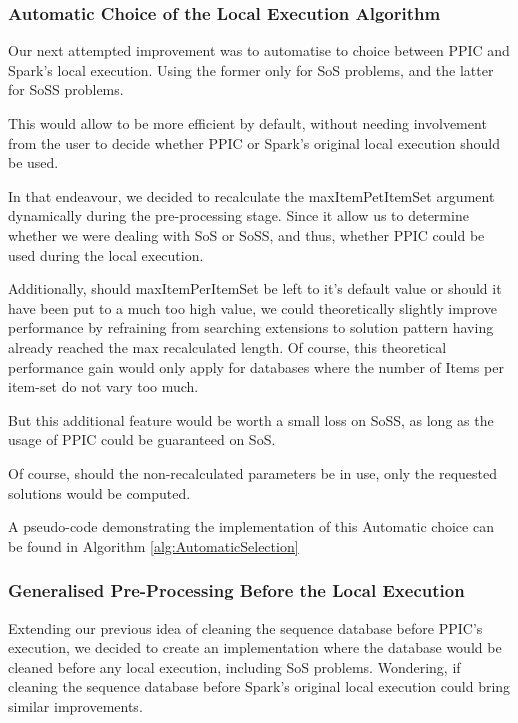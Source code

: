 \documentclass{eplmastersthesis}
\begin{document}
\subsubsection{Automatic Choice of the Local Execution Algorithm}

Our next attempted improvement was to automatise to choice between PPIC and Spark's local execution. Using the former only for \acrlong{SoS} problems, and the latter for \acrlong{SoSS} problems. \newline

This would allow to be more efficient by default, without needing involvement from the user to decide whether PPIC or Spark's original local execution should be used.

In that endeavour, we decided to recalculate the maxItemPetItemSet argument dynamically during the pre-processing stage. Since it allow us to determine whether we were dealing with \acrshort{SoS} or \acrshort{SoSS}, and thus, whether PPIC could be used during the local execution. \newline

Additionally, should maxItemPerItemSet be left to it's default value or should it have been put to a much too high value, we could theoretically slightly improve performance by refraining from searching extensions to solution pattern having already reached the max recalculated length. Of course, this theoretical performance gain would only apply for databases where the number of Items per item-set do not vary too much.\newline

But this additional feature would be worth a small loss on \acrshort{SoSS}, as long as the usage of PPIC could be guaranteed on \acrshort{SoS}. \newline

Of course, should the non-recalculated parameters be in use, only the requested solutions would be computed.

A pseudo-code demonstrating the implementation of this Automatic choice can be found in Algorithm \ref{alg:AutomaticSelection}

\subsubsection{Generalised Pre-Processing Before the Local Execution}

Extending our previous idea of cleaning the sequence database before PPIC's execution, we decided to create an implementation where the database would be cleaned before any local execution, including \acrshort{SoS} problems. Wondering, if cleaning the sequence database before Spark's original local execution could bring similar improvements. \newline
\end{document}
